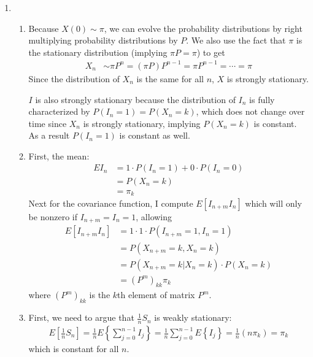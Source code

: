 \documentclass[12pt]{article}
\theoremstyle{plain}
\theoremstyle{definition}
\theoremstyle{remark}
\begin{document}
\begin{enumerate}
\begin{enumerate}
      \item %
      \item %

    \end{enumerate}

  \item %
    \begin{enumerate}
      \item %
        Because $X(0)\sim \pi$, we can evolve the probability
        distributions by right multiplying probability distributions by
        $P$. We also use the fact that $\pi$ is the stationary
        distribution (implying $\pi P = \pi$) to get
        \begin{align*}
          X_n &\sim \pi P^n = (\pi P)P^{n-1} = \pi P^{n-1} = \cdots = \pi
        \end{align*}
        Since the distribution of $X_n$ is the same for all $n$, $X$ is
        strongly stationary.

        $I$ is also strongly stationary because the distribution of
        $I_n$ is fully characterized by $P(I_n=1)=P(X_n=k)$, which does
        not change over time since $X_n$ is strongly stationary,
        implying $P(X_n=k)$ is constant. As a result $P(I_n=1)$ is
        constant as well.

      \item %
        First, the mean:
        \begin{align*}
          EI_n &= 1\cdot P(I_n=1) + 0\cdot P(I_n=0)\\
          &= P(X_n=k)\\
          &= \pi_k
        \end{align*}
        Next for the covariance function, I compute $E[I_{n+m}I_n]$
        which will only be nonzero if $I_{n+m}=I_n=1$, allowing
        \begin{align*}
          E[I_{n+m}I_n] &= 1 \cdot 1\cdot P(I_{n+m}=1, I_n=1)\\
          &= P(X_{n+m}=k , X_n=k)\\
          &= P(X_{n+m}=k | X_n=k)\cdot P(X_n=k)\\
          &= (P^m)_{kk}  \pi_k
        \end{align*}
        where $(P^m)_{kk}$ is the $k$th element of matrix $P^m$.

      \item %
        First, we need to argue that $\frac{1}{n}S_n$ is weakly stationary:
        \begin{align*}
          E\left[\frac{1}{n}S_n\right] = \frac{1}{n}E\left\{\sum^{n-1}_{j=0}I_j\right\}
            = \frac{1}{n}\sum^{n-1}_{j=0}E\left\{I_j\right\}
            = \frac{1}{n} (n \pi_k) = \pi_k
        \end{align*}
        which is constant for all $n$.


\end{enumerate}
\end{enumerate}
\end{document}
